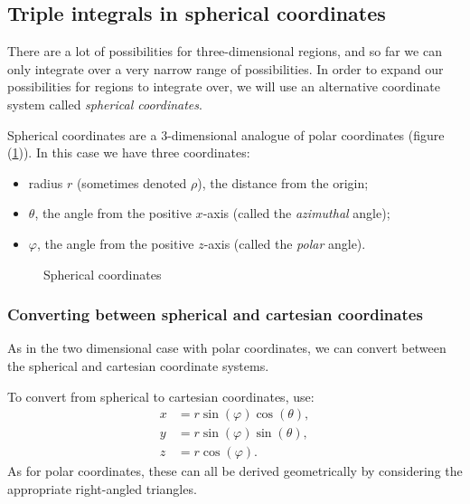 \subsection{Triple integrals in spherical coordinates}
  
  There are a lot of possibilities for three-dimensional regions, and so far we can only integrate over a very narrow range of possibilities.  In order to expand our possibilities for regions to integrate over, we will use an alternative coordinate system called \emph{spherical coordinates}.

  Spherical coordinates are a $3$-dimensional analogue of polar coordinates (figure (\ref{spherical})).  In this case we have three coordinates:
    \begin{itemize}
      \item radius $r$ (sometimes denoted $\rho$), the distance from the origin;
      \item $\theta$, the angle from the positive $x$-axis (called the \emph{azimuthal} angle);
      \item $\varphi$, the angle from the positive $z$-axis (called the \emph{polar} angle).
    \end{itemize}
  
  \begin{figure}[H]
    \centering
    \def\svgwidth{0.5\columnwidth}
    
    \caption{Spherical coordinates}
    \label{spherical}
  \end{figure}
    
  \subsubsection*{Converting between spherical and cartesian coordinates}
  
  As in the two dimensional case with polar coordinates, we can convert between the spherical and cartesian coordinate systems.
  
  To convert from spherical to cartesian coordinates, use:
    \begin{align*}
      x & = r\sin(\varphi)\cos(\theta),  \\
      y & = r\sin(\varphi)\sin(\theta),  \\
      z & = r\cos(\varphi).
    \end{align*}
  As for polar coordinates, these can all be derived geometrically by considering the appropriate right-angled triangles.
  
